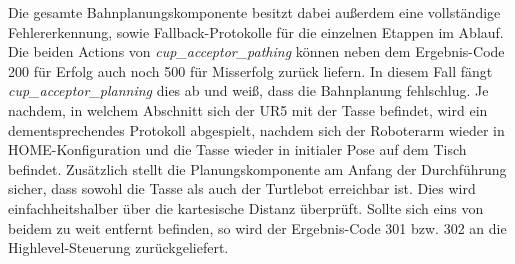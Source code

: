 \newline
Die gesamte Bahnplanungskomponente besitzt dabei außerdem eine vollständige Fehlererkennung, sowie Fallback-Protokolle für die einzelnen Etappen im Ablauf. Die beiden Actions von \textit{cup\_acceptor\_pathing} können neben dem Ergebnis-Code 200 für Erfolg auch noch 500 für Misserfolg zurück liefern. In diesem Fall fängt \textit{cup\_acceptor\_planning} dies ab und weiß, dass die Bahnplanung fehlschlug. Je nachdem, in welchem Abschnitt sich der UR5 mit der Tasse befindet, wird ein dementsprechendes Protokoll abgespielt, nachdem sich der Roboterarm wieder in HOME-Konfiguration und die Tasse wieder in initialer Pose auf dem Tisch befindet. Zusätzlich stellt die Planungskomponente am Anfang der Durchführung sicher, dass sowohl die Tasse als auch der Turtlebot erreichbar ist. Dies wird einfachheitshalber über die kartesische Distanz überprüft. Sollte sich eins von beidem zu weit entfernt befinden, so wird der Ergebnis-Code 301 bzw. 302 an die Highlevel-Steuerung zurückgeliefert.
